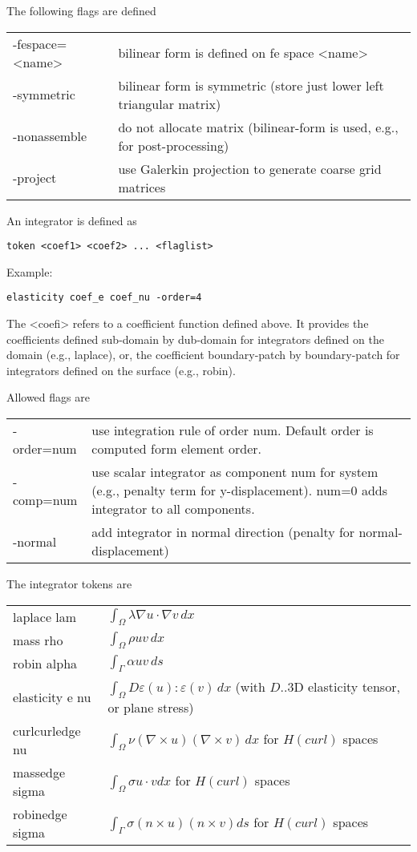 \documentclass[12pt]{book}
\begin{document}
The following flags are defined \newline
\begin{tabular}{|l|l|}
\hline
-fespace=<name> & bilinear form is defined on fe space <name> \\
-symmetric    & bilinear form is symmetric (store just lower left triangular matrix)  \\
-nonassemble  & do not allocate matrix (bilinear-form is used, e.g., for post-processing) \\
-project & use Galerkin projection to generate coarse grid matrices \\
\hline
\end{tabular}


An integrator is defined as
\begin{verbatim}
token <coef1> <coef2> ... <flaglist>
\end{verbatim}
Example:
\begin{verbatim}
elasticity coef_e coef_nu -order=4
\end{verbatim}
The <coefi> refers to a coefficient function defined above. It
provides the coefficients defined sub-domain by dub-domain for
integrators defined on the domain (e.g., laplace), or, the coefficient
boundary-patch by boundary-patch for integrators defined on the
surface (e.g., robin).

Allowed flags are \newline
\begin{tabular}{|l|l|}
\hline
-order=num & use integration rule of order num. Default order is computed form element order. \\
-comp=num & use scalar integrator as component num for system (e.g., penalty term for y-displacement). num=0 adds integrator to all components. \\
-normal   & add integrator in normal direction (penalty for normal-displacement) \\
\hline
\end{tabular}

The integrator tokens are \newline
\begin{tabular}{|l|l|}
\hline
laplace lam  &    $\int_\Omega \lambda \nabla u \cdot \nabla v \, dx$ \\
mass rho     &    $\int_\Omega \rho  u  v \, dx$ \\
robin alpha  &    $\int_\Gamma \alpha u v \, ds$ \\
elasticity e nu & $\int_\Omega D \varepsilon(u) : \varepsilon(v) \, dx$  
(with $D$..3D elasticity tensor, or plane stress) \\
\hline
curlcurledge nu &    $\int_\Omega \nu (\nabla \times u) (\nabla \times v) \, dx$ for $H(curl)$ spaces \\
massedge sigma &    $\int_\Omega \sigma u \cdot v dx$ for $H(curl)$ spaces \\
robinedge sigma &   $\int_\Gamma \sigma (n \times u) (n \times v)  ds$ for $H(curl)$ spaces \\
\hline
\end{tabular}
\end{document}
